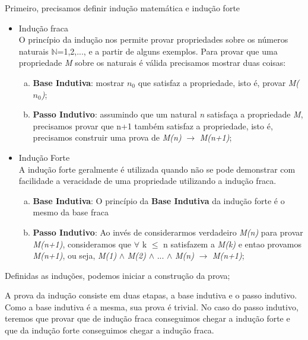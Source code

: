 \documentclass[a4paper, 10pt]{article}
\begin{document}
\vspace{5mm}Primeiro, precisamos definir indução matemática e indução forte
\begin{itemize}
\item Indução fraca\\ 
	O princípio da indução nos permite provar propriedades sobre os números naturais $\mathbb{N}$={1,2,...}, e a partir de alguns exemplos.
    Para provar que uma propriedade \textit{M} sobre os naturais é válida precisamos mostrar duas coisas:
    
	\begin{enumerate} [a)]	
    \item \textbf{Base Indutiva}: mostrar \textit{$n_0$} que satisfaz a propriedade, isto é, provar \textit{M(\textit{$n_0$})};
    \item \textbf{Passo Indutivo}: assumindo que um natural \textit{n} satisfaça a propriedade \textit{M}, precisamos provar que n+1 também satisfaz a propriedade, isto é, precisamos construir uma prova de \textit{M(n)} $\rightarrow$ \textit{ M(n+1)};
	\end{enumerate}
    
\item Indução Forte\\
	A indução forte geralmente é utilizada quando não se pode demonstrar com facilidade a veracidade de uma propriedade utilizando a indução fraca.    
    \begin{enumerate}[a)]
    \item \textbf{Base Indutiva}: O princípio da \textbf{Base Indutiva} da indução forte é o mesmo da base fraca
    \item \textbf{Passo Indutivo}: Ao invés de considerarmos verdadeiro \textit{M(n)} para provar \textit{ M(n+1)}, consideramos que $\forall$ k $\le$ n satisfazem a \textit{M(k)} e entao provamos \textit{M(n+1)}, ou seja, \textit{M(1)} $\wedge$ \textit{M(2)} $\wedge$ ... $\wedge$ \textit{M(n)} $\rightarrow$ \textit{ M(n+1)};
    \end{enumerate}
\end{itemize}

Definidas as induções, podemos iniciar a construção da prova; 

A prova da indução consiste em duas etapas, a base indutiva e o passo indutivo.
Como a base indutiva é a mesma, sua prova é trivial.
No caso do passo indutivo, teremos que provar que de indução fraca conseguimos chegar a indução forte e que da indução forte conseguimos chegar a indução fraca.
\end{document}
